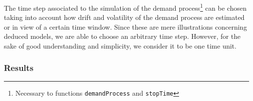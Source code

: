 

The time step associated to the simulation of the demand process\footnote{Necessary to functions \texttt{demandProcess} and \texttt{stopTime}} can be chosen taking into account how drift and volatility of the demand process are estimated or in view of a certain time window.
Since these are mere illustrations concerning deduced models, we are able to choose an arbitrary time step. However, for the sake of good understanding and simplicity, we consider it to be one time unit.





\subsubsection{Results}

